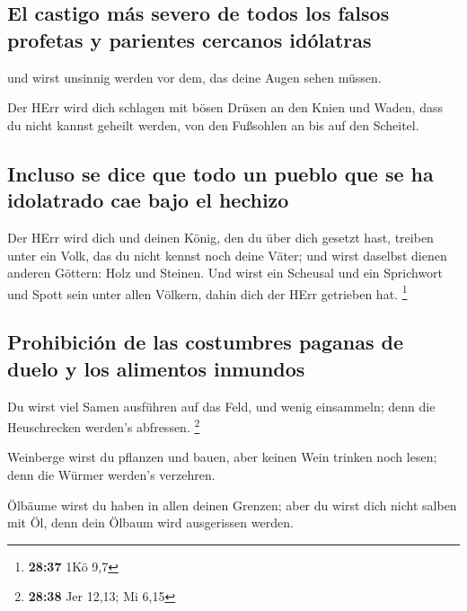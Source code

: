 \hypertarget{el-castigo-muxe1s-severo-de-todos-los-falsos-profetas-y-parientes-cercanos-iduxf3latras}{%
\subsection{El castigo más severo de todos los falsos profetas y
parientes cercanos
idólatras}\label{el-castigo-muxe1s-severo-de-todos-los-falsos-profetas-y-parientes-cercanos-iduxf3latras}}

 und wirst unsinnig werden vor dem, das deine Augen sehen
müssen.

 Der HErr wird dich schlagen mit bösen Drüsen an den
Knien und Waden, dass du nicht kannst geheilt werden, von den Fußsohlen
an bis auf den Scheitel.

\hypertarget{incluso-se-dice-que-todo-un-pueblo-que-se-ha-idolatrado-cae-bajo-el-hechizo}{%
\subsection{Incluso se dice que todo un pueblo que se ha idolatrado cae
bajo el
hechizo}\label{incluso-se-dice-que-todo-un-pueblo-que-se-ha-idolatrado-cae-bajo-el-hechizo}}

 Der HErr wird dich und deinen König, den du über dich
gesetzt hast, treiben unter ein Volk, das du nicht kennst noch deine
Väter; und wirst daselbst dienen anderen Göttern: Holz und Steinen.
 Und wirst ein Scheusal und ein Sprichwort und Spott sein
unter allen Völkern, dahin dich der HErr getrieben hat. \footnote{\textbf{28:37}
  1Kö 9,7}

\hypertarget{prohibiciuxf3n-de-las-costumbres-paganas-de-duelo-y-los-alimentos-inmundos}{%
\subsection{Prohibición de las costumbres paganas de duelo y los
alimentos
inmundos}\label{prohibiciuxf3n-de-las-costumbres-paganas-de-duelo-y-los-alimentos-inmundos}}

 Du wirst viel Samen ausführen auf das Feld, und wenig
einsammeln; denn die Heuschrecken werden's abfressen. \footnote{\textbf{28:38}
  Jer 12,13; Mi 6,15}

 Weinberge wirst du pflanzen und bauen, aber keinen Wein
trinken noch lesen; denn die Würmer werden's verzehren.

 Ölbäume wirst du haben in allen deinen Grenzen; aber du
wirst dich nicht salben mit Öl, denn dein Ölbaum wird ausgerissen
werden.

